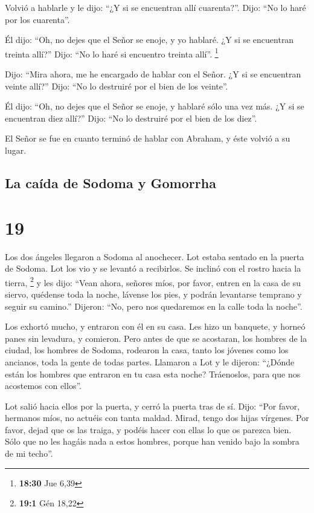  Volvió a hablarle y le dijo: ``¿Y si se encuentran allí
cuarenta?''. Dijo: ``No lo haré por los cuarenta''.

 Él dijo: ``Oh, no dejes que el Señor se enoje, y yo
hablaré. ¿Y si se encuentran treinta allí?'' Dijo: ``No lo haré si
encuentro treinta allí''. \footnote{\textbf{18:30} Jue 6,39}

 Dijo: ``Mira ahora, me he encargado de hablar con el
Señor. ¿Y si se encuentran veinte allí?'' Dijo: ``No lo destruiré por el
bien de los veinte''.

 Él dijo: ``Oh, no dejes que el Señor se enoje, y hablaré
sólo una vez más. ¿Y si se encuentran diez allí?'' Dijo: ``No lo
destruiré por el bien de los diez''.

 El Señor se fue en cuanto terminó de hablar con Abraham,
y éste volvió a su lugar.

\hypertarget{la-cauxedda-de-sodoma-y-gomorrha}{%
\subsection{La caída de Sodoma y
Gomorrha}\label{la-cauxedda-de-sodoma-y-gomorrha}}

\hypertarget{section-18}{%
\section{19}\label{section-18}}

 Los dos ángeles llegaron a Sodoma al anochecer. Lot
estaba sentado en la puerta de Sodoma. Lot los vio y se levantó a
recibirlos. Se inclinó con el rostro hacia la tierra, \footnote{\textbf{19:1}
  Gén 18,22}  y les dijo: ``Vean ahora, señores míos, por
favor, entren en la casa de su siervo, quédense toda la noche, lávense
los pies, y podrán levantarse temprano y seguir su camino.'' Dijeron:
``No, pero nos quedaremos en la calle toda la noche''.

 Los exhortó mucho, y entraron con él en su casa. Les hizo
un banquete, y horneó panes sin levadura, y comieron. 
Pero antes de que se acostaran, los hombres de la ciudad, los hombres de
Sodoma, rodearon la casa, tanto los jóvenes como los ancianos, toda la
gente de todas partes.  Llamaron a Lot y le dijeron:
``¿Dónde están los hombres que entraron en tu casa esta noche?
Tráenoslos, para que nos acostemos con ellos''.

 Lot salió hacia ellos por la puerta, y cerró la puerta
tras de sí.  Dijo: ``Por favor, hermanos míos, no actuéis
con tanta maldad.  Mirad, tengo dos hijas vírgenes. Por
favor, dejad que os las traiga, y podéis hacer con ellas lo que os
parezca bien. Sólo que no les hagáis nada a estos hombres, porque han
venido bajo la sombra de mi techo''.

